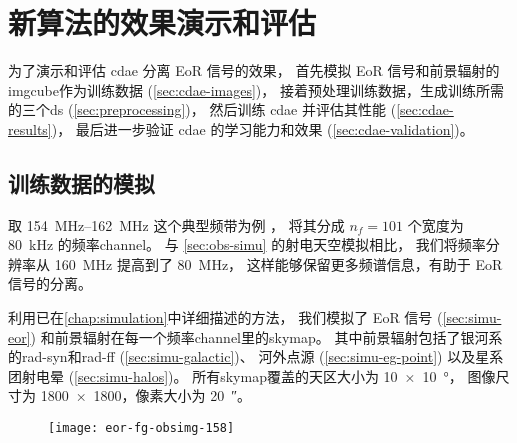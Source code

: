 \section{新算法的效果演示和评估}
\label{sec:cdae-demo}

为了演示和评估 \ac{cdae} 分离 EoR 信号的效果，
首先模拟 EoR 信号和前景辐射的\ac{imgcube}作为训练数据 (\autoref{sec:cdae-images})，
接着预处理训练数据，生成训练所需的三个\ac{ds} (\autoref{sec:preprocessing})，
然后训练 \ac{cdae} 并评估其性能 (\autoref{sec:cdae-results})，
最后进一步验证 \ac{cdae} 的学习能力和效果 (\autoref{sec:cdae-validation})。

\subsection{训练数据的模拟}
\label{sec:cdae-images}

取 \SIrange{154}{162}{\MHz} 这个典型频带为例 \cite{datta2010}，
将其分成 $n_f = 101$ 个宽度为 \SI{80}{\kHz} 的频率\ac{channel}。
与 \autoref{sec:obs-simu} 的射电天空模拟相比，
我们将频率分辨率从 \SI{160}{\MHz} 提高到了 \SI{80}{\MHz}，
这样能够保留更多频谱信息，有助于 EoR 信号的分离。

利用已在\autoref{chap:simulation}中详细描述的方法，
我们模拟了 EoR 信号 (\autoref{sec:simu-eor})
和前景辐射在每一个频率\ac{channel}里的\ac{skymap}。
其中前景辐射包括了银河系的\ac{rad-syn}和\ac{rad-ff} (\autoref{sec:simu-galactic})、
河外点源 (\autoref{sec:simu-eg-point})
以及星系团射电晕 (\autoref{sec:simu-halos})。
所有\ac{skymap}覆盖的天区大小为 \SI{10 x 10}{\degree}，
图像尺寸为 \num{1800 x 1800}，像素大小为 \SI{20}{\arcsecond}。

\begin{figure}[htp]
  \centering
  \texttt{[image: eor-fg-obsimg-158]}
  \label{fig:eor-fg-obsimg}
\end{figure}

